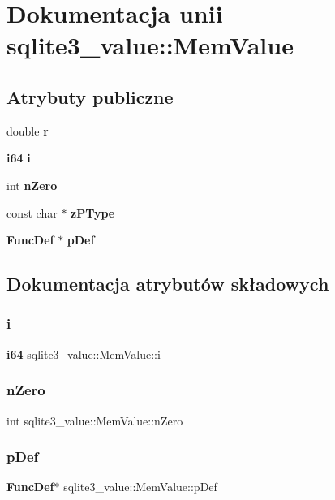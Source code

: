 \section{Dokumentacja unii sqlite3\+\_\+value\+::Mem\+Value}
\label{unionsqlite3__value_1_1_mem_value}
\subsection*{Atrybuty publiczne}
\begin{DoxyCompactItemize}
\item 
double \textbf{ r}
\item 
\textbf{ i64} \textbf{ i}
\item 
int \textbf{ n\+Zero}
\item 
const char $\ast$ \textbf{ z\+P\+Type}
\item 
\textbf{ Func\+Def} $\ast$ \textbf{ p\+Def}
\end{DoxyCompactItemize}


\subsection{Dokumentacja atrybutów składowych}
\mbox{\label{unionsqlite3__value_1_1_mem_value_a78ff7d79ce07bfb54646dbbb3eae0dc4}} 
\subsubsection{i}
{\footnotesize\ttfamily \textbf{ i64} sqlite3\+\_\+value\+::\+Mem\+Value\+::i}

\mbox{\label{unionsqlite3__value_1_1_mem_value_ab645dbef00d6f58e885d8b1d072ab205}} 
\subsubsection{nZero}
{\footnotesize\ttfamily int sqlite3\+\_\+value\+::\+Mem\+Value\+::n\+Zero}

\mbox{\label{unionsqlite3__value_1_1_mem_value_a971d4e0122cca11b98f7f64cb757302b}} 
\subsubsection{pDef}
{\footnotesize\ttfamily \textbf{ Func\+Def}$\ast$ sqlite3\+\_\+value\+::\+Mem\+Value\+::p\+Def}

